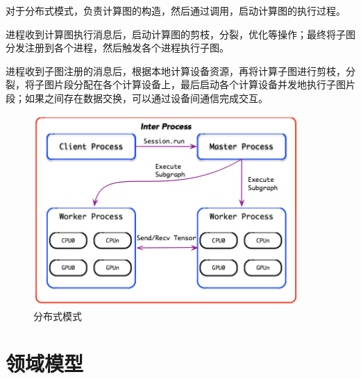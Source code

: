 \begin{content}
对于分布式模式，负责计算图的构造，然后通过调用，启动计算图的执行过程。

进程收到计算图执行消息后，启动计算图的剪枝，分裂，优化等操作；最终将子图分发注册到各个进程，然后触发各个进程执行子图。

进程收到子图注册的消息后，根据本地计算设备资源，再将计算子图进行剪枝，分裂，将子图片段分配在各个计算设备上，最后启动各个计算设备并发地执行子图片段；如果之间存在数据交换，可以通过设备间通信完成交互。

\begin{figure}[!h]
\centering
\includegraphics[width=0.9\textwidth]{figures/distributed.png}
\caption{分布式模式}
 \label{fig:distributed}
\end{figure}

\end{content}

\section{领域模型}

